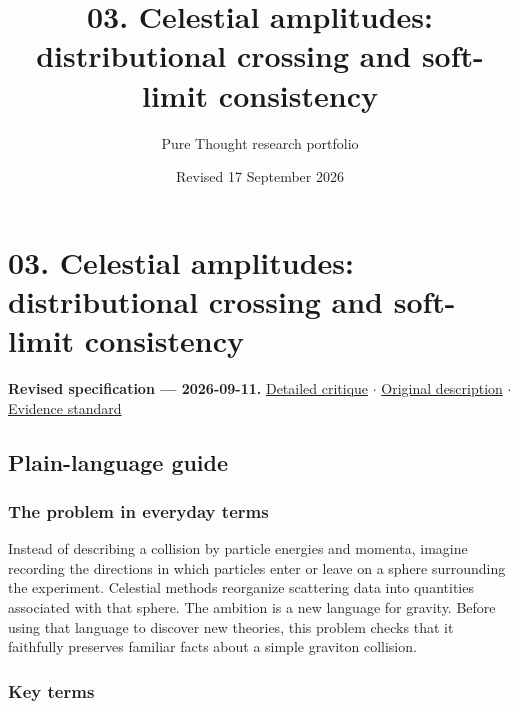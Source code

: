 \documentclass[
  11pt,
]{article}
\title{03. Celestial amplitudes: distributional crossing and soft-limit
consistency}
\author{Pure Thought research portfolio}
\date{Revised 17 September 2026}
\begin{document}
\maketitle
\thispagestyle{empty}
\clearpage

\section{03. Celestial amplitudes: distributional crossing and
soft-limit consistency}

\textbf{Revised specification --- 2026-09-11.}
\href{https://github.com/rick-stevens-ai/Pure-Thought/blob/main/reviews/03-Celestial-CFT-Bootstrap.md}{Detailed
critique} \ensuremath{\cdot}
\href{https://github.com/rick-stevens-ai/Pure-Thought/blob/main/archive/original-PRDs/03-Celestial-CFT-Bootstrap.md}{Original
description} \ensuremath{\cdot}
\href{https://github.com/rick-stevens-ai/Pure-Thought/blob/main/reviews/EVIDENCE-STANDARD.md}{Evidence
standard}

\subsection{Plain-language guide}

\subsubsection{The problem in everyday terms}

Instead of describing a collision by particle energies and momenta,
imagine recording the directions in which particles enter or leave on a
sphere surrounding the experiment. Celestial methods reorganize
scattering data into quantities associated with that sphere. The
ambition is a new language for gravity. Before using that language to
discover new theories, this problem checks that it faithfully preserves
familiar facts about a simple graviton collision.

\subsubsection{Key terms}
\end{document}
